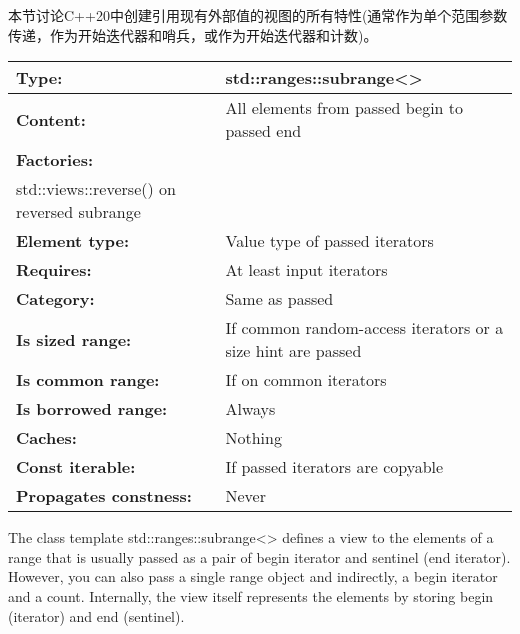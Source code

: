 
本节讨论C++20中创建引用现有外部值的视图的所有特性(通常作为单个范围参数传递，作为开始迭代器和哨兵，或作为开始迭代器和计数)。


\begin{longtable}[c]{|l|l|}
\hline
\textbf{Type:}                 & std::ranges::subrange\textless{}\textgreater{} \\ \hline
\endfirsthead
%
\endhead
%
\textbf{Content:}              & All elements from passed begin to passed end   \\ \hline
\textbf{Factories:}      & \begin{tabular}[c]{@{}l@{}}std::views::counted()\\ std::views::reverse() on reversed subrange\end{tabular} \\ \hline
\textbf{Element type:}         & Value type of passed iterators                 \\ \hline
\textbf{Requires:}             & At least input iterators                       \\ \hline
\textbf{Category:}             & Same as passed                                 \\ \hline
\textbf{Is sized range:} & If common random-access iterators or a size hint are passed                                                \\ \hline
\textbf{Is common range:}      & If on common iterators                         \\ \hline
\textbf{Is borrowed range:}    & Always                                         \\ \hline
\textbf{Caches:}               & Nothing                                        \\ \hline
\textbf{Const iterable:}       & If passed iterators are copyable               \\ \hline
\textbf{Propagates constness:} & Never                                          \\ \hline
\end{longtable}

The class template std::ranges::subrange<> defines a view to the elements of a range that is usually passed as a pair of begin iterator and sentinel (end iterator). However, you can also pass a single range object and indirectly, a begin iterator and a count. Internally, the view itself represents the elements by storing begin (iterator) and end (sentinel).

